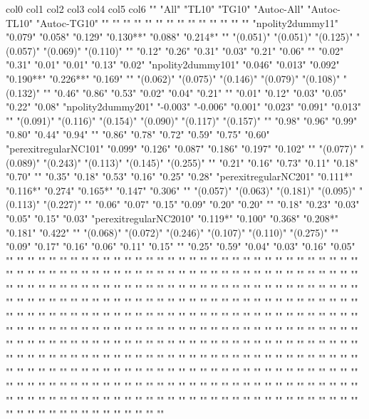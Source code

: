 col0	col1	col2	col3	col4	col5	col6
""	"All"	"TL10"	"TG10"	"Autoc-All"	"Autoc-TL10"	"Autoc-TG10"
""	""	""	""	""	""	""
""	""	""	""	""	""	""
"npolity2dummy11"	"0.079"	"0.058"	"0.129"	"0.130**"	"0.088"	"0.214*"
""	"(0.051)"	"(0.051)"	"(0.125)"	"(0.057)"	"(0.069)"	"(0.110)"
""	"0.12"	"0.26"	"0.31"	"0.03"	"0.21"	"0.06"
""	"0.02"	"0.31"	"0.01"	"0.01"	"0.13"	"0.02"
"npolity2dummy101"	"0.046"	"0.013"	"0.092"	"0.190**"	"0.226**"	"0.169"
""	"(0.062)"	"(0.075)"	"(0.146)"	"(0.079)"	"(0.108)"	"(0.132)"
""	"0.46"	"0.86"	"0.53"	"0.02"	"0.04"	"0.21"
""	"0.01"	"0.12"	"0.03"	"0.05"	"0.22"	"0.08"
"npolity2dummy201"	"-0.003"	"-0.006"	"0.001"	"0.023"	"0.091"	"0.013"
""	"(0.091)"	"(0.116)"	"(0.154)"	"(0.090)"	"(0.117)"	"(0.157)"
""	"0.98"	"0.96"	"0.99"	"0.80"	"0.44"	"0.94"
""	"0.86"	"0.78"	"0.72"	"0.59"	"0.75"	"0.60"
"perexitregularNC101"	"0.099"	"0.126"	"0.087"	"0.186"	"0.197"	"0.102"
""	"(0.077)"	"(0.089)"	"(0.243)"	"(0.113)"	"(0.145)"	"(0.255)"
""	"0.21"	"0.16"	"0.73"	"0.11"	"0.18"	"0.70"
""	"0.35"	"0.18"	"0.53"	"0.16"	"0.25"	"0.28"
"perexitregularNC201"	"0.111*"	"0.116*"	"0.274"	"0.165*"	"0.147"	"0.306"
""	"(0.057)"	"(0.063)"	"(0.181)"	"(0.095)"	"(0.113)"	"(0.227)"
""	"0.06"	"0.07"	"0.15"	"0.09"	"0.20"	"0.20"
""	"0.18"	"0.23"	"0.03"	"0.05"	"0.15"	"0.03"
"perexitregularNC2010"	"0.119*"	"0.100"	"0.368"	"0.208*"	"0.181"	"0.422"
""	"(0.068)"	"(0.072)"	"(0.246)"	"(0.107)"	"(0.110)"	"(0.275)"
""	"0.09"	"0.17"	"0.16"	"0.06"	"0.11"	"0.15"
""	"0.25"	"0.59"	"0.04"	"0.03"	"0.16"	"0.05"
""	""	""	""	""	""	""
""	""	""	""	""	""	""
""	""	""	""	""	""	""
""	""	""	""	""	""	""
""	""	""	""	""	""	""
""	""	""	""	""	""	""
""	""	""	""	""	""	""
""	""	""	""	""	""	""
""	""	""	""	""	""	""
""	""	""	""	""	""	""
""	""	""	""	""	""	""
""	""	""	""	""	""	""
""	""	""	""	""	""	""
""	""	""	""	""	""	""
""	""	""	""	""	""	""
""	""	""	""	""	""	""
""	""	""	""	""	""	""
""	""	""	""	""	""	""
""	""	""	""	""	""	""
""	""	""	""	""	""	""
""	""	""	""	""	""	""
""	""	""	""	""	""	""
""	""	""	""	""	""	""
""	""	""	""	""	""	""
""	""	""	""	""	""	""
""	""	""	""	""	""	""
""	""	""	""	""	""	""
""	""	""	""	""	""	""
""	""	""	""	""	""	""
""	""	""	""	""	""	""
""	""	""	""	""	""	""
""	""	""	""	""	""	""
""	""	""	""	""	""	""
""	""	""	""	""	""	""
""	""	""	""	""	""	""
""	""	""	""	""	""	""
""	""	""	""	""	""	""
""	""	""	""	""	""	""
""	""	""	""	""	""	""
""	""	""	""	""	""	""
""	""	""	""	""	""	""
""	""	""	""	""	""	""
""	""	""	""	""	""	""
""	""	""	""	""	""	""
""	""	""	""	""	""	""
""	""	""	""	""	""	""
""	""	""	""	""	""	""
""	""	""	""	""	""	""
""	""	""	""	""	""	""
""	""	""	""	""	""	""
""	""	""	""	""	""	""
""	""	""	""	""	""	""
""	""	""	""	""	""	""
""	""	""	""	""	""	""
